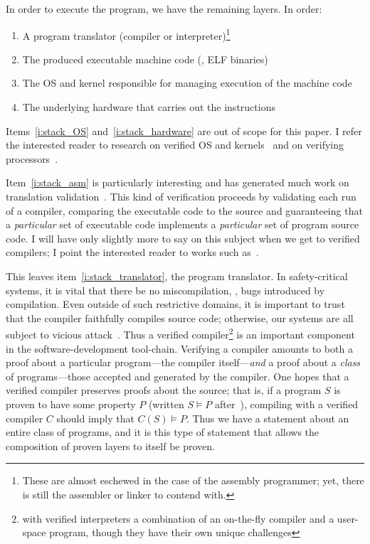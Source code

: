 In order to execute the program, we have the remaining layers. In order:
\begin{enumerate}
    \item\label{i:stack_translator} A program translator (compiler or
        interpreter)\footnote{These are almost eschewed in the case of the
        assembly programmer; yet, there is still the assembler or linker to
        contend with.}
    \item\label{i:stack_asm} The produced executable machine code (\eg, ELF
        binaries)
    \item\label{i:stack_OS} The OS and kernel responsible for managing execution
        of the machine code
    \item\label{i:stack_hardware} The underlying hardware that carries out the
        instructions
\end{enumerate}

Items~\ref{i:stack_OS} and~\ref{i:stack_hardware} are out of scope for this
paper. I refer the interested reader to research on verified OS and
kernels~\cite{Klein_EHACDEEKNSTW_09,Klein_AEHCDEEKNSTW_10,Klein_AEMSKH_14,Sewell_KH_16,Narayanan_2019,Narayan_2020,Nelson_2017}
and on verifying
processors~\cite{sturton-memocode13,Sturton_2013,Bradfield_2016,zhang2017identifying,zhang2018recursive,zhang2018end}.

Item~\ref{i:stack_asm} is particularly interesting and has generated much work
on translation validation~\cite{Pnueli_1998}. This kind of verification proceeds
by validating each run of a compiler, comparing the executable code to the
source and guaranteeing that a \emph{particular} set of executable code
implements a \emph{particular} set of program source code. I will have only
slightly more to say on this subject when we get to verified compilers; I point
the interested reader to works such
as~\cite{Sewell:phd,Sewell_KH_16,Sewell_2013,Necula_2000}.

This leaves item~\ref{i:stack_translator}, the program translator. In
safety-critical systems, it is vital that there be no miscompilation, \ie, bugs
introduced by compilation. Even outside of such restrictive domains, it is
important to trust that the compiler faithfully compiles source code; otherwise,
our systems are all subject to vicious attack~\cite{Thompson_1984}. Thus a
verified compiler\footnote{with verified interpreters a combination of an
on-the-fly compiler and a user-space program, though they have their own unique
challenges} is an important component in the software-development tool-chain.
Verifying a compiler amounts to both a proof about a particular program---the
compiler itself---\emph{and} a proof about a \emph{class} of programs---those
accepted and generated by the compiler. One hopes that a verified compiler
preserves proofs about the source; that is, if a program \(S\) is proven to have
some property \(P\) (written \(S \models P\) after~\cite{Leroy-Compcert-CACM}),
compiling with a verified compiler \(C\) should imply that \(C(S) \models P\).
Thus we have a statement about an entire class of programs, and it is this type
of statement that allows the composition of proven layers to itself be proven.

